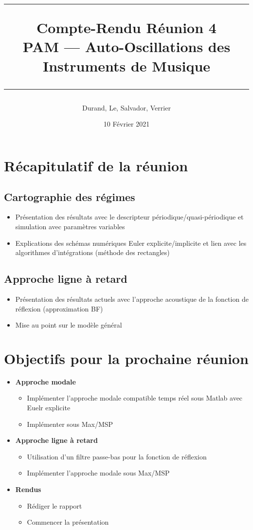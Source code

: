 \documentclass[a4paper, 11pt]{article}
\title{
	\noindent\rule{\linewidth}{0.4pt}
	\huge{Compte-Rendu Réunion 4\\}
	\medskip
	\Large{PAM --- Auto-Oscillations des Instruments de Musique}
	\noindent\rule{\linewidth}{1pt}
}
\author{Durand, Le, Salvador, Verrier}
\date{10 Février 2021}
\begin{document}
\maketitle


\section{Récapitulatif de la réunion}
\subsection{Cartographie des régimes}
\begin{itemize}
	\item Présentation des résultats avec le descripteur périodique/quasi-périodique et simulation avec paramètres variables
	\item Explications des schémas numériques Euler explicite/implicite et lien avec les algorithmes d'intégrations (méthode des rectangles)
\end{itemize}
\subsection{Approche ligne à retard}
\begin{itemize}
	\item Présentation des résultats actuels avec l'approche acoustique de la fonction de réflexion (approximation BF)
	\item Mise au point sur le modèle général
\end{itemize}

\section{Objectifs pour la prochaine réunion}
\begin{itemize}
	\item \textbf{Approche modale}
	\begin{itemize}
		\item Implémenter l'approche modale compatible temps réel sous Matlab avec Euelr explicite
		\item Implémenter sous Max/MSP
	\end{itemize}
	\item \textbf{Approche ligne à retard}
	\begin{itemize}
		\item Utilisation d'un filtre passe-bas pour la fonction de réflexion
		\item Implémenter l'approche modale sous Max/MSP
	\end{itemize}
	\item \textbf{Rendus}
	\begin{itemize}
		\item Rédiger le rapport
		\item Commencer la présentation
	\end{itemize}
\end{itemize}
\end{document}
